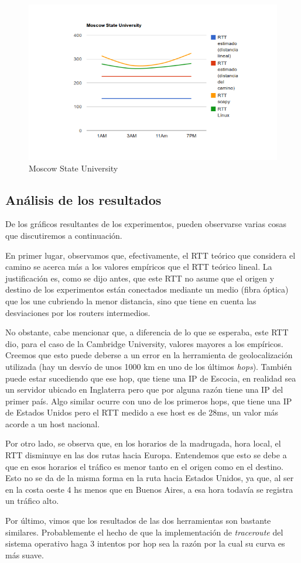 \begin{figure}[h!]
    \centering
    \includegraphics[width=400pt]{msu.png}
    \caption{Moscow State University}
    \label{fig:msu:count}
\end{figure}

\subsection{Análisis de los resultados}
De los gráficos resultantes de los experimentos, pueden observarse varias
cosas que discutiremos a continuación.

En primer lugar, observamos que, efectivamente, el RTT teórico que considera
el camino se acerca más a los valores empíricos que el RTT teórico lineal. La
justificación es, como se dijo antes, que este RTT no asume que el origen y
destino de los experimentos están conectados mediante un medio (fibra óptica)
que los une cubriendo la menor distancia, sino que tiene en cuenta las
desviaciones por los routers intermedios.

No obstante, cabe mencionar que, a diferencia de lo que se esperaba, este RTT
dio, para el caso de la Cambridge University, valores mayores a los empíricos.
Creemos que esto puede deberse a un error en la herramienta de geolocalización
utilizada (hay un desvío de unos 1000 km en uno de los últimos \emph{hops}).
También puede estar sucediendo que ese hop, que tiene una IP de Escocia, en
realidad sea un servidor ubicado en Inglaterra pero que por alguna razón tiene
una IP del primer país. Algo similar ocurre con uno de los primeros hops, que
tiene una IP de Estados Unidos pero el RTT medido a ese host es de 28ms, un
valor más acorde a un host nacional.

Por otro lado, se observa que, en los horarios de la madrugada, hora local, el
RTT disminuye en las dos rutas hacia Europa. Entendemos que esto se debe a que
en esos horarios el tráfico es menor tanto en el origen como en el destino.
Esto no se da de la misma forma en la ruta hacia Estados Unidos, ya que, al
ser en la costa oeste 4 hs menos que en Buenos Aires, a esa hora todavía se
registra un tráfico alto.

Por último, vimos que los resultados de las dos herramientas son bastante
similares. Probablemente el hecho de que la implementación de
\emph{traceroute} del sistema operativo haga 3 intentos por hop sea la razón
por la cual su curva es más suave.

